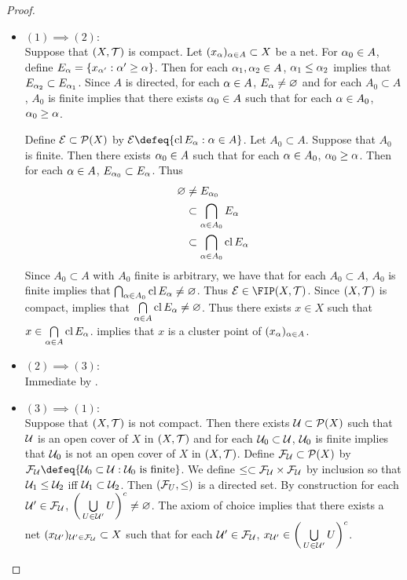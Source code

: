 \documentclass{book}
\begin{document}
	\begin{proof}\
		\begin{itemize}
			\item $(1) \implies (2)$: \\
			Suppose that $(X, \mathcal{T})$ is compact. Let $(x_{\alpha})_{\alpha \in A} \subset X$ be a net. For $\alpha_0 \in A$, define $E_{\alpha} = \{x_{\alpha'} : \alpha' \geq \alpha\}$. Then for each $\alpha_1, \alpha_2 \in A$, $\alpha_1 \leq \alpha_2$ implies that $E_{\alpha_2} \subset E_{\alpha_1}$. Since $A$ is directed, for each $\alpha \in A$, $E_{\alpha} \neq \varnothing$ and for each $A_0 \subset A$, $A_0$ is finite implies that there exists $\alpha_0 \in A$ such that for each $\alpha \in A_0$, $\alpha_0 \geq \alpha$. 
			
			Define $\mathcal{E} \subset \mathcal{P}(X)$ by $\ME \defeq \{\cl E_{\al}: \al \in A\}$. Let $A_0 \subset A$. Suppose that $A_0$ is finite. Then there exists $\alpha_0 \in A$ such that for each $\alpha \in A_0$, $\alpha_0 \geq \alpha$. Then for each $\alpha \in A$, $E_{\alpha_0} \subset E_{\alpha}$. Thus 
			\begin{align*}
				\varnothing 
				& \neq E_{\alpha_0} \\
				& \subset \bigcap_{\alpha \in A_0} E_{\alpha} \\
				& \subset \bigcap_{\alpha \in A_0} \operatorname{cl} E_{\alpha}
			\end{align*}
			Since $A_0 \subset A$ with $A_0$ finite is arbitrary, we have that for each $A_0 \subset A$, $A_0$ is finite implies that $\bigcap_{\alpha \in A_0} \operatorname{cl} E_{\alpha} \neq \varnothing$. Thus $\ME \in \FIP(X, \MT)$. Since $(X, \mathcal{T})$ is compact,  implies that $\bigcap\limits_{\alpha \in A} \operatorname{cl} E_{\alpha} \neq \varnothing$. Thus there exists $x \in X$ such that $x \in \bigcap\limits_{\alpha \in A} \operatorname{cl} E_{\alpha}$.  implies that $x$ is a cluster point of $(x_{\alpha})_{\alpha \in A}$.
			\item $(2) \implies (3)$: \\
			Immediate by .
			\item $(3) \implies (1)$: \\
			Suppose that $(X, \mathcal{T})$ is not compact. Then there exists $\mathcal{U} \subset \mathcal{P}(X)$ such that $\mathcal{U}$ is an open cover of $X$ in $(X, \mathcal{T})$ and for each $\mathcal{U}_0 \subset \mathcal{U}$, $\mathcal{U}_0$ is finite implies that $\mathcal{U}_0$ is not an open cover of $X$ in $(X, \mathcal{T})$. Define $\mathcal{F}_{\mathcal{U}} \subset \mathcal{P}(X)$ by $\MF_{\MU} \defeq \{\MU_0 \subset \MU: \MU_0 \text{ is finite}\}$. We define $\leq \subset \mathcal{F}_{\mathcal{U}} \times \mathcal{F}_{\mathcal{U}}$ by inclusion so that $\mathcal{U}_1 \leq \mathcal{U}_2$ iff $\mathcal{U}_1 \subset \mathcal{U}_2$. Then $(\mathcal{F}_U, \leq)$ is a directed set. By construction for each $\mathcal{U}' \in \mathcal{F}_{\mathcal{U}}$, $\bigg( \bigcup\limits_{U \in \mathcal{U}'} U \bigg)^c \neq \varnothing$. The axiom of choice implies that there exists a net $(x_{\mathcal{U}'})_{\mathcal{U}' \in \mathcal{F}_{\mathcal{U}}} \subset X$ such that for each $\mathcal{U}' \in \mathcal{F}_{\mathcal{U}}$, $x_{\mathcal{U}'} \in \bigg( \bigcup\limits_{U \in \mathcal{U}'} U \bigg)^c$. 
			

\end{itemize}
\end{proof}
\end{document}
